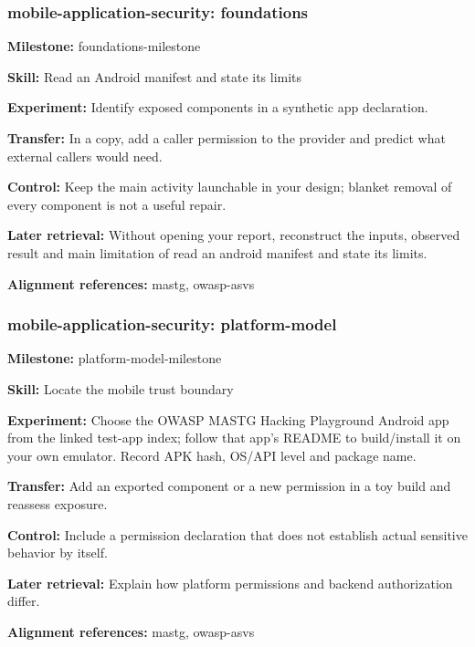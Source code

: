 \subsubsection{mobile-application-security: foundations}
\noindent\textbf{Milestone:} foundations-milestone\par
\noindent\textbf{Skill:} Read an Android manifest and state its limits\par
\noindent\textbf{Experiment:} Identify exposed components in a synthetic app declaration.\par
\noindent\textbf{Transfer:} In a copy, add a caller permission to the provider and predict what external callers would need.\par
\noindent\textbf{Control:} Keep the main activity launchable in your design; blanket removal of every component is not a useful repair.\par
\noindent\textbf{Later retrieval:} Without opening your report, reconstruct the inputs, observed result and main limitation of read an android manifest and state its limits.\par
\noindent\textbf{Alignment references:} mastg, owasp-asvs\par
\subsubsection{mobile-application-security: platform-model}
\noindent\textbf{Milestone:} platform-model-milestone\par
\noindent\textbf{Skill:} Locate the mobile trust boundary\par
\noindent\textbf{Experiment:} Choose the OWASP MASTG Hacking Playground Android app from the linked test-app index; follow that app’s README to build/install it on your own emulator. Record APK hash, OS/API level and package name.\par
\noindent\textbf{Transfer:} Add an exported component or a new permission in a toy build and reassess exposure.\par
\noindent\textbf{Control:} Include a permission declaration that does not establish actual sensitive behavior by itself.\par
\noindent\textbf{Later retrieval:} Explain how platform permissions and backend authorization differ.\par
\noindent\textbf{Alignment references:} mastg, owasp-asvs\par
